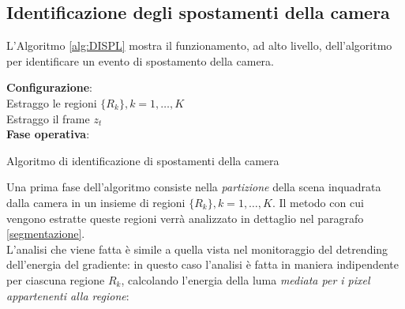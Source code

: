 \subsection{Identificazione degli spostamenti della camera}
\label{monitoraggioDISPL}
L'Algoritmo \ref{alg:DISPL} mostra il funzionamento, ad alto livello, dell'algoritmo per identificare un evento di spostamento della camera.\\
\begin{algorithm}[t]
	\LinesNumbered
	\textbf{Configurazione}:\\
	 Estraggo le regioni $\{R_k\}, k=1,\dots,K$  \\
	 
	{	 Estraggo il frame $z_t$ \\
		 
	}
	 
	\textbf{Fase operativa}:\\
	    
	\caption{Algoritmo di identificazione di spostamenti della camera}
	\label{alg:DISPL}
\end{algorithm}
Una prima fase dell'algoritmo consiste nella \textit{partizione} della scena inquadrata dalla camera in un insieme di regioni $\{R_k\}, k=1,\dots,K$.
Il metodo con cui vengono estratte queste regioni verr\`a analizzato in dettaglio nel paragrafo \ref{segmentazione}. \\
L'analisi che viene fatta \`e simile a quella vista nel monitoraggio del detrending dell'energia del gradiente:
in questo caso l'analisi \`e fatta in maniera indipendente per ciascuna regione $R_k$, calcolando l'energia della luma \textit{mediata per i pixel appartenenti alla regione}:
